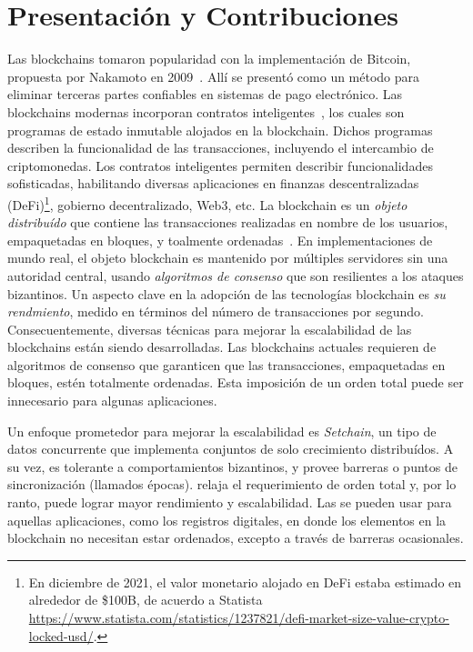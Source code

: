 
\section{Presentación y Contribuciones}
Las blockchains tomaron
popularidad con la implementación de Bitcoin, propuesta por Nakamoto en
2009~\cite{nakamoto06bitcoin}.
Allí se presentó como un método para eliminar terceras partes confiables en sistemas
de pago electrónico.
%
Las blockchains modernas incorporan contratos inteligentes~\cite{szabo96smart,ethereum},
los cuales son programas de estado inmutable alojados en la blockchain. Dichos
programas describen la funcionalidad de las transacciones, incluyendo el intercambio
de criptomonedas.
%
Los contratos inteligentes permiten describir funcionalidades sofisticadas, habilitando
diversas aplicaciones en finanzas descentralizadas (DeFi)\footnote{En diciembre de 2021,
el valor monetario alojado en DeFi estaba estimado en alrededor de \$100B, de acuerdo a Statista
\url{https://www.statista.com/statistics/1237821/defi-market-size-value-crypto-locked-usd/}.},
gobierno decentralizado, Web3, etc.
%
La blockchain es un \textit{objeto distribuído} que contiene las transacciones realizadas
en nombre de los usuarios, empaquetadas en bloques, y toalmente
ordenadas~\cite{anta2018formalizing,anta2021principles}.
%
En implementaciones de mundo real, el objeto blockchain es mantenido por múltiples servidores
sin una autoridad central, usando \emph{algoritmos de consenso} que son resilientes a los
ataques bizantinos.
%
Un aspecto clave en la adopción de las tecnologías blockchain es \emph{su rendmiento}, medido
en términos del número de transacciones por segundo.
%
Consecuentemente, diversas técnicas para mejorar la escalabilidad de las blockchains
están siendo desarrolladas.
%
Las blockchains actuales requieren de algoritmos de consenso que garanticen que las
transacciones, empaquetadas en bloques, estén totalmente ordenadas.
%
Esta imposición de un orden total puede ser innecesario para algunas aplicaciones.


%
Un enfoque prometedor para mejorar la escalabilidad es \textit{Setchain}, un tipo de
datos concurrente que implementa conjuntos de solo crecimiento distribuídos. A su vez,
es tolerante a comportamientos bizantinos, y provee barreras o puntos de sincronización
(llamados épocas).
%
\setchain relaja el requerimiento de orden total y, por lo ranto, puede lograr mayor
rendimiento y escalabilidad.
%
Las \setchains se pueden usar para aquellas aplicaciones, como los registros digitales,
en donde los elementos en la blockchain no necesitan estar ordenados, excepto a través
de barreras ocasionales.

